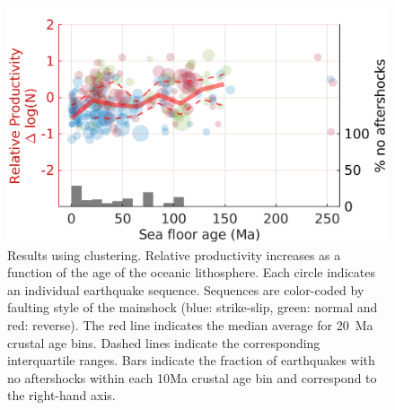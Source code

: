 \documentclass[draft]{agujournal}
\begin{document}
\begin{figure}[H]
    \centering

        \includegraphics{figures/prod_vs_age_z2008.png}
    
    \caption{Results using \citet{Zaliapin2008} clustering. Relative productivity increases as a function of the age of the oceanic lithosphere. Each circle indicates an individual earthquake sequence. Sequences are color-coded by faulting style of the mainshock (blue: strike-slip, green: normal and red: reverse). The red line indicates the median average for 20~Ma crustal age bins. Dashed lines indicate the corresponding interquartile ranges. Bars indicate the fraction of earthquakes with no aftershocks within each 10Ma crustal age bin and correspond to the right-hand axis.}
        \label{fig:prod_vs_age_z2008}
\end{figure}

\end{document}
